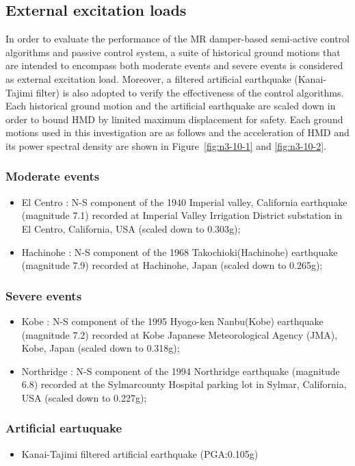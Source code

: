 \subsection{External excitation loads}
In order to evaluate the performance of the MR damper-based semi-active control algorithms and passive control system, a suite of historical ground motions that are intended to encompass both moderate events and severe events is considered as external excitation load. Moreover, a filtered artificial earthquake (Kanai-Tajimi filter) is also adopted to verify the effectiveness of the control algorithms. Each historical ground motion and the artificial earthquake are scaled down in order to bound HMD by limited maximum displacement for safety. Each ground motions used in this investigation are as follows and the acceleration of HMD and its power spectral density are shown in Figure~\ref{fig:n3-10-1} and \ref{fig:n3-10-2}.

\subsubsection{Moderate events}
\begin{itemize}
\item El Centro : N-S component of the 1940 Imperial valley, California earthquake (magnitude 7.1) recorded at Imperial Valley Irrigation District substation in El Centro, California, USA (scaled down to 0.303g);
\item Hachinohe : N-S component of the 1968 Takochioki(Hachinohe) earthquake (magnitude 7.9) recorded at Hachinohe, Japan (scaled down to 0.265g);
\end{itemize}

\subsubsection{Severe events}
\begin{itemize}
   \item Kobe : N-S component of the 1995 Hyogo-ken Nanbu(Kobe) earthquake (magnitude 7.2) recorded at Kobe Japanese Meteorological Agency (JMA), Kobe, Japan (scaled down to 0.318g);

   \item  Northridge : N-S component of the 1994 Northridge earthquake (magnitude 6.8) recorded at the Sylmarcounty Hospital parking lot in Sylmar, California, USA (scaled down to 0.227g);
\end{itemize}

\subsubsection{Artificial eartuquake}
\begin{itemize}
   \item  Kanai-Tajimi filtered artificial earthquake (PGA:0.105g)
\end{itemize}

